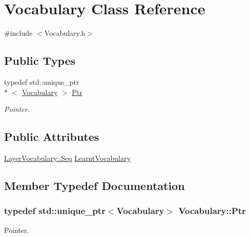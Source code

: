 \hypertarget{class_vocabulary}{\section{Vocabulary Class Reference}
\label{class_vocabulary}
}


{\ttfamily \#include $<$Vocabulary.\-h$>$}

\subsection*{Public Types}
\begin{DoxyCompactItemize}
\item 
typedef std\-::unique\-\_\-ptr\\*
$<$ \hyperlink{class_vocabulary}{Vocabulary} $>$ \hyperlink{class_vocabulary_aaeaf17c4e25e6d7c8cb3ce9598c74715}{Ptr}
\begin{DoxyCompactList}\small\item\em Pointer. \end{DoxyCompactList}\end{DoxyCompactItemize}
\subsection*{Public Attributes}
\begin{DoxyCompactItemize}
\item 
\hyperlink{class_layer_vocabulary_a6098bd61090934286a749873181b5077}{Layer\-Vocabulary\-::\-Seq} \hyperlink{class_vocabulary_a773229c5a76412765f5e486c287bea88}{Learnt\-Vocabulary}
\end{DoxyCompactItemize}


\subsection{Member Typedef Documentation}
\hypertarget{class_vocabulary_aaeaf17c4e25e6d7c8cb3ce9598c74715}{
\subsubsection[{Ptr}]{\setlength{\rightskip}{0pt plus 5cm}typedef std\-::unique\-\_\-ptr$<${\bf Vocabulary}$>$ {\bf Vocabulary\-::\-Ptr}}}\label{class_vocabulary_aaeaf17c4e25e6d7c8cb3ce9598c74715}


Pointer. 



